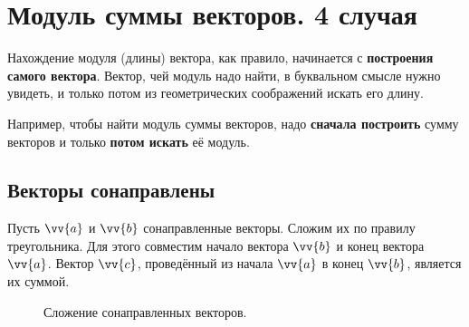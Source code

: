 \section{Модуль суммы векторов. 4 случая}
Нахождение модуля (длины) вектора, как правило, начинается с \textbf{построения самого вектора}.
Вектор, чей модуль надо найти, в буквальном смысле нужно увидеть, и
только потом из геометрических соображений искать его длину.

Например, чтобы найти модуль суммы векторов,
надо \textbf{сначала построить} сумму векторов и только
\textbf{потом искать} её модуль.
\subsection{Векторы сонаправлены}
Пусть $\vv{a}$ и $\vv{b}$ \bdash сонаправленные векторы. Сложим их по правилу треугольника.
Для этого совместим начало вектора $\vv{b}$ и конец вектора $\vv{a}$. Вектор $\vv{c}$,
проведённый из начала $\vv{a}$ в конец $\vv{b}$, является их суммой.

\begin{figure}[h!]
  \centering
  \hspace{1.4cm}
  \caption{\small Сложение сонаправленных векторов.}\label{pic:sum1}
\end{figure}

